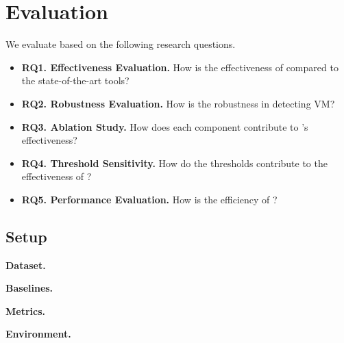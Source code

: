 
\section{Evaluation}

We evaluate \tool based on the following research questions.



\begin{itemize}[leftmargin=*]
  \item \textbf{RQ1. Effectiveness Evaluation.} How is the effectiveness of \tool compared to the state-of-the-art tools?
  \item \textbf{RQ2. Robustness Evaluation.} How is the robustness \tool in detecting VM?
  \item \textbf{RQ3. Ablation Study.} How does each component contribute to \tool's effectiveness?
  \item \textbf{RQ4. Threshold Sensitivity.} How do the thresholds contribute to the effectiveness of \tool?
  \item \textbf{RQ5. Performance Evaluation.} How is the efficiency of \tool?
\end{itemize}


\subsection{Setup}

\textbf{Dataset.}

\textbf{Baselines.}


\textbf{Metrics.}

\textbf{Environment.}



